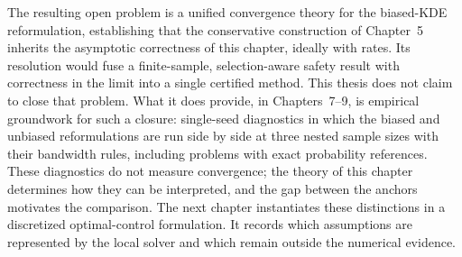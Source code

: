 The resulting open problem is a unified convergence
theory for the biased-KDE reformulation, establishing that the
conservative construction of Chapter~5 inherits the asymptotic
correctness of this chapter, ideally with rates. Its resolution would
fuse a finite-sample, selection-aware safety result with correctness in the
limit into a single certified method.
This thesis does not claim to close that problem. What it does provide,
in Chapters~7--9, is empirical groundwork for such a closure:
single-seed diagnostics in which the biased and unbiased reformulations
are run side by side at three nested sample sizes with their bandwidth
rules, including problems with exact probability references. These
diagnostics do not measure convergence; the theory of this chapter
determines how they can be interpreted, and the gap between the anchors
motivates the comparison.
The next chapter instantiates these distinctions in a discretized optimal-control
formulation. It records which assumptions are represented by the local solver and
which remain outside the numerical evidence.
